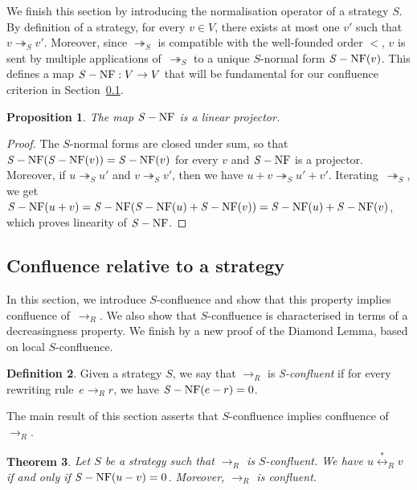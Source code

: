 \documentclass[10pt]{easychair}
\newtheorem{theorem}{Theorem}[section]
\newtheorem{proposition}[theorem]{Proposition}
\theoremstyle{definition}
\newtheorem{definition}[theorem]{Definition}
\newcommand\rewR{\to_R}
\newcommand\rewS{\twoheadrightarrow_S}
\newcommand\equivR{\overset{*}{\leftrightarrow}_R}
\DeclareMathOperator{\SNF}{{\it S}-NF}
\begin{document}
We finish this section by introducing the normalisation operator of a
strategy $S$. By definition of a strategy, for every $v\in V$, there
exists at most one $v'$ such that $v\rewS v'$. Moreover, since $\rewS$ is
compatible with the well-founded order $<$, $v$ is sent by multiple
applications of~$\rewS$ to a unique $S$-normal form $\SNF(v)$. This
defines a map $\SNF:V\to V$ that will be fundamental for our confluence
criterion in Section~\ref{sec:confluence_relative_to_a_strategy}.
\medskip

\begin{proposition}\label{prop:linearity_of_H}
  The map $\SNF$ is a linear projector.
\end{proposition}

\begin{proof}
  The $S$-normal forms are closed under sum, so that
  $\SNF(\SNF(v))=\SNF(v)$ for every $v$ and $\SNF$ is a projector.
  Moreover, if $u\rewS u'$ and $v\rewS v'$, then we have
  $u+v\rewS u'+v'$. Iterating~$\rewS$, we get
  $\SNF(u+v)=\SNF(\SNF(u)+\SNF(v))=\SNF(u)+\SNF(v)$, which proves
  linearity of $\SNF$.
\end{proof}

\subsection{Confluence relative to a strategy}
\label{sec:confluence_relative_to_a_strategy}

In this section, we introduce $S$-confluence and show that this property
implies confluence of~$\rewR$. We also show that $S$-confluence is
characterised in terms of a decreasingness property. We finish by a new
proof of the Diamond Lemma, based on local $S$-confluence.
\smallskip

\begin{definition}\label{def:standardisation_property}
  Given a strategy $S$, we say that $\rewR$ is \emph{S-confluent} if for
  every rewriting rule~$e\rewR r$, we have $\SNF(e-r)=0$.
\end{definition}
\smallskip

The main result of this section asserts that $S$-confluence implies
confluence of $\rewR$.
\medskip

\begin{theorem}\label{thm:h_and_R_confluence}
  Let $S$ be a strategy such that $\rewR$ is $S$-confluent. We have 
  $u\equivR v$ if and only if $\SNF(u-v)=0$. Moreover, $\rewR$ is
  confluent.
\end{theorem}
\end{document}
